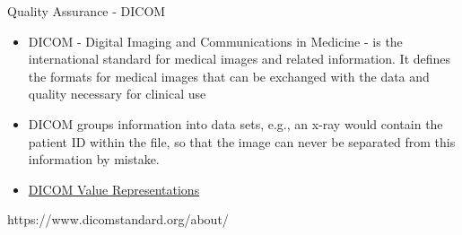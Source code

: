 \documentclass[10pt, xcolor=table]{beamer}
\begin{document}




%

\begin{frame}{Quality Assurance - DICOM}
	\begin{itemize}
		\item DICOM - Digital Imaging and Communications in Medicine - is the international standard for medical images and related information. It defines the formats for medical images that can be exchanged with the data and quality necessary for clinical use
		\item DICOM groups information into data sets, e.g., an x-ray would contain the patient ID within the file, so that the image can never be separated from this information by mistake.
		\item \href{http://dicom.nema.org/medical/dicom/current/output/chtml/part05/sect_6.2.html\#table_6.2-1}{\color{blue}DICOM Value Representations}
	\end{itemize}
	
	\scriptsize{https://www.dicomstandard.org/about/}
\end{frame}
\end{document}
